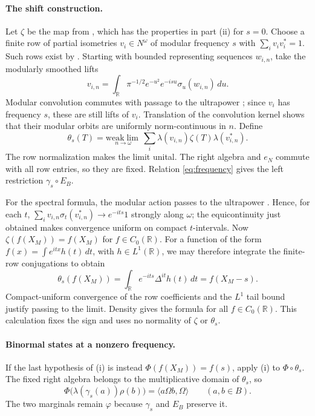 \documentclass[11pt]{article}
\theoremstyle{definition}
\newcommand{\R}{\mathbb R}
\begin{document}
\paragraph{The shift construction.}
Let $\zeta$ be the map from \cite[Lemma~2.2(1)]{M2}, which has the
properties in part (ii) for $s=0$. Choose a finite row of partial isometries $v_i\in N^\omega$ of modular
frequency $s$ with $\sum_i v_iv_i^*=1$. Such rows exist by
\cite[Lemma~3.4 and the proof of Theorem~A(ii)]{AHHM}. Starting with bounded
representing sequences $w_{i,n}$, take the modularly smoothed lifts
\[
 v_{i,n}=\int_\R \pi^{-1/2}e^{-u^2}e^{-isu}\sigma_u(w_{i,n})\,du.
\]
Modular convolution commutes with passage to the ultrapower
\cite[Lemma~4.14]{AndoHaagerup2014}; since $v_i$ has frequency $s$, these
are still lifts of $v_i$. Translation of the convolution kernel shows that
their modular orbits are uniformly norm-continuous in $n$. Define
\[
 \theta_s(T)=\underset{n\to\omega}{\mathrm{weak}\!\lim}\,
 \sum_i\lambda(v_{i,n})\zeta(T)\lambda(v_{i,n}^*).
\]
The row normalization makes the limit unital. The right algebra and $e_N$
commute with all row entries, so they are fixed. Relation
\eqref{eq:frequency} gives the left restriction $\gamma_s\circ E_B$.

For the spectral formula, the modular action passes to the ultrapower
\cite[Theorem~4.1]{AndoHaagerup2014}. Hence, for each $t$,
$\sum_i v_{i,n}\sigma_t(v_{i,n}^*)\to e^{-its}1$ strongly along $\omega$;
the equicontinuity just obtained makes convergence uniform on compact
$t$-intervals. Now $\zeta(f(X_M))=f(X_M)$ for $f\in C_0(\R)$.
For a function of the form $f(x)=\int e^{itx}h(t)\,dt$, with $h\in L^1(\R)$,
we may therefore integrate the finite-row conjugations to obtain
\[
 \theta_s(f(X_M))
 =\int_\R e^{-its}\Delta^{it}h(t)\,dt=f(X_M-s).
\]
Compact-uniform convergence of the row coefficients and the $L^1$ tail
bound justify passing to the limit. Density gives the formula for all
$f\in C_0(\R)$. This calculation fixes the sign and uses no normality of
$\zeta$ or $\theta_s$.

\paragraph{Binormal states at a nonzero frequency.}
If the last hypothesis of (i) is instead $\Phi(f(X_M))=f(s)$, apply (i) to
$\Phi\circ\theta_s$. The fixed right algebra belongs to the multiplicative
domain of $\theta_s$, so
\begin{equation}\label{eq:binormal-s}
 \Phi\big(\lambda(\gamma_s(a))\rho(b)\big)
 =\langle a\Omega b,\Omega\rangle\qquad(a,b\in B).
\end{equation}
The two marginals remain $\varphi$ because $\gamma_s$ and $E_B$ preserve it.
\end{document}
